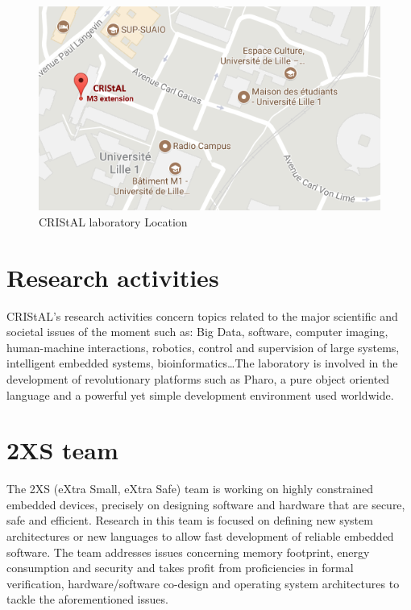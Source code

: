 \begin{figure}[!ht]
	\centering
	\includegraphics[scale=0.4 , frame]{img/cristalLocation.png} 
	\caption{CRIStAL laboratory Location}
\end{figure}


\section{Research activities}

CRIStAL's research activities concern topics related to the major scientific and societal issues of the moment such as: Big Data, software, computer imaging, human-machine interactions, robotics, control and supervision of large systems, intelligent embedded systems, bioinformatics\dots The laboratory is involved in the development of revolutionary platforms such as Pharo, a pure object oriented language and a powerful yet simple development environment used worldwide.

\section{2XS team}

The 2XS (eXtra Small, eXtra Safe) team is working on highly constrained embedded devices, precisely on designing software and hardware that are secure, safe and efficient. Research in this team is focused on defining new system architectures or new languages to allow fast development of reliable embedded software. The team addresses issues concerning memory footprint, energy consumption and security and takes profit from proficiencies in formal verification, hardware/software co-design and operating system architectures to tackle the aforementioned issues.\\


